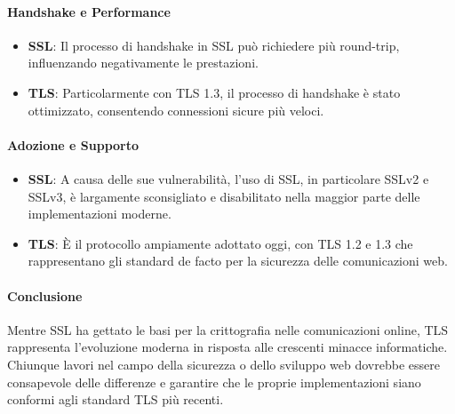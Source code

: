 \documentclass{article}
\theoremstyle{definition}
\begin{document}
\paragraph{Handshake e Performance}

\begin{itemize}
    \item \textbf{SSL}: Il processo di handshake in SSL può richiedere più round-trip, influenzando negativamente le prestazioni.
    
    \item \textbf{TLS}: Particolarmente con TLS 1.3, il processo di handshake è stato ottimizzato, consentendo connessioni sicure più veloci.
\end{itemize}

\paragraph{Adozione e Supporto}

\begin{itemize}
    \item \textbf{SSL}: A causa delle sue vulnerabilità, l'uso di SSL, in particolare SSLv2 e SSLv3, è largamente sconsigliato e disabilitato nella maggior parte delle implementazioni moderne.
    
    \item \textbf{TLS}: È il protocollo ampiamente adottato oggi, con TLS 1.2 e 1.3 che rappresentano gli standard de facto per la sicurezza delle comunicazioni web.
\end{itemize}

\paragraph{Conclusione}

Mentre SSL ha gettato le basi per la crittografia nelle comunicazioni online, TLS rappresenta l'evoluzione moderna in risposta alle crescenti minacce informatiche. Chiunque lavori nel campo della sicurezza o dello sviluppo web dovrebbe essere consapevole delle differenze e garantire che le proprie implementazioni siano conformi agli standard TLS più recenti.


\clearpage

\printbibliography



\end{document}
